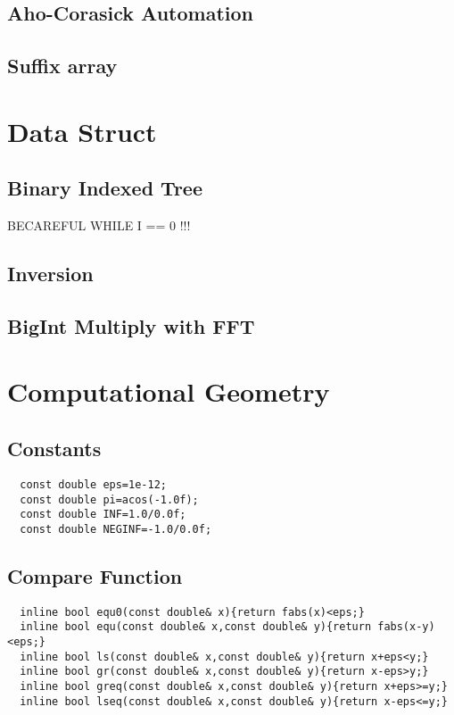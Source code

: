\documentclass[a4paper]{article}
\begin{document}
\subsection {Aho-Corasick Automation}

\subsection {Suffix array}

\section{Data Struct}
\subsection {Binary Indexed Tree}
BECAREFUL WHILE I == 0 !!!

\subsection {Inversion}

\subsection {BigInt Multiply with FFT}

\section{Computational Geometry}
\subsection{Constants}
\begin{lstlisting}
  const double eps=1e-12;
  const double pi=acos(-1.0f);
  const double INF=1.0/0.0f;
  const double NEGINF=-1.0/0.0f;
\end{lstlisting}
\subsection{Compare Function}
\begin{lstlisting}
  inline bool equ0(const double& x){return fabs(x)<eps;}
  inline bool equ(const double& x,const double& y){return fabs(x-y)<eps;}
  inline bool ls(const double& x,const double& y){return x+eps<y;}
  inline bool gr(const double& x,const double& y){return x-eps>y;}
  inline bool greq(const double& x,const double& y){return x+eps>=y;}
  inline bool lseq(const double& x,const double& y){return x-eps<=y;}
\end{lstlisting}
\end{document}
